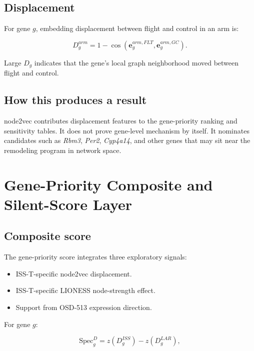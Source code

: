 \documentclass[11pt]{article}
\newcommand{\gene}[1]{\textit{#1}}
\begin{document}
\subsection{Displacement}

For gene $g$, embedding displacement between flight and control in an arm is:

\begin{equation}
D_g^{arm}=1-\cos(\mathbf{e}^{arm,FLT}_g,\mathbf{e}^{arm,GC}_g).
\end{equation}

Large $D_g$ indicates that the gene's local graph neighborhood moved between flight and control.

\subsection{How this produces a result}

node2vec contributes displacement features to the gene-priority ranking and sensitivity tables. It does not prove gene-level mechanism by itself. It nominates candidates such as \gene{Rbm3}, \gene{Per2}, \gene{Cyp4a14}, and other genes that may sit near the remodeling program in network space.

\section{Gene-Priority Composite and Silent-Score Layer}

\subsection{Composite score}

The gene-priority score integrates three exploratory signals:

\begin{itemize}
  \item ISS-T-specific node2vec displacement.
  \item ISS-T-specific LIONESS node-strength effect.
  \item Support from OSD-513 expression direction.
\end{itemize}

For gene $g$:

\begin{equation}
\mathrm{Spec}^{D}_g=z(D_g^{ISS})-z(D_g^{LAR}),
\end{equation}
\end{document}
